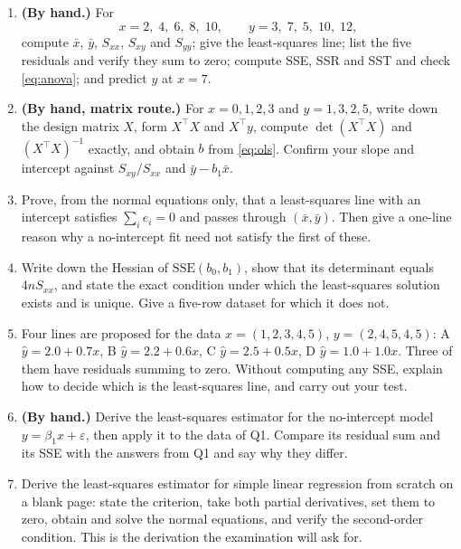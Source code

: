 \documentclass[11pt]{article}
\begin{document}
\begin{enumerate}[leftmargin=*,label=\textbf{Q\arabic*.}]
  \item \textbf{(By hand.)} For
    \[
      x = 2,\;4,\;6,\;8,\;10, \qquad y = 3,\;7,\;5,\;10,\;12,
    \]
    compute $\bar x$, $\bar y$, $S_{xx}$, $S_{xy}$ and $S_{yy}$; give the
    least-squares line; list the five residuals and verify they sum to zero;
    compute SSE, SSR and SST and check \eqref{eq:anova}; and predict $y$ at
    $x=7$.

  \item \textbf{(By hand, matrix route.)} For $x = 0,1,2,3$ and
    $y = 1,3,2,5$, write down the design matrix $X$, form $X^{\!\top}\!X$ and
    $X^{\!\top}y$, compute $\det(X^{\!\top}\!X)$ and $(X^{\!\top}\!X)^{-1}$
    exactly, and obtain $b$ from \eqref{eq:ols}. Confirm your slope and
    intercept against $S_{xy}/S_{xx}$ and $\bar y - b_1\bar x$.

  \item Prove, from the normal equations only, that a least-squares line with
    an intercept satisfies $\sum_i e_i = 0$ and passes through
    $(\bar x, \bar y)$. Then give a one-line reason why a no-intercept fit
    need not satisfy the first of these.

  \item Write down the Hessian of $\mathrm{SSE}(b_0,b_1)$, show that its
    determinant equals $4nS_{xx}$, and state the exact condition under which
    the least-squares solution exists and is unique. Give a five-row dataset
    for which it does not.

  \item Four lines are proposed for the data $x=(1,2,3,4,5)$,
    $y=(2,4,5,4,5)$: A $\hat y = 2.0+0.7x$, B $\hat y = 2.2+0.6x$,
    C $\hat y = 2.5+0.5x$, D $\hat y = 1.0+1.0x$. Three of them have
    residuals summing to zero. Without computing any SSE, explain how to
    decide which is the least-squares line, and carry out your test.

  \item \textbf{(By hand.)} Derive the least-squares estimator for the
    no-intercept model $y = \beta_1x + \varepsilon$, then apply it to the data
    of Q1. Compare its residual sum and its SSE with the answers from Q1 and
    say why they differ.

  \item Derive the least-squares estimator for simple linear regression from
    scratch on a blank page: state the criterion, take both partial
    derivatives, set them to zero, obtain and solve the normal equations, and
    verify the second-order condition. This is the derivation the examination
    will ask for.


\end{enumerate}
\end{document}
